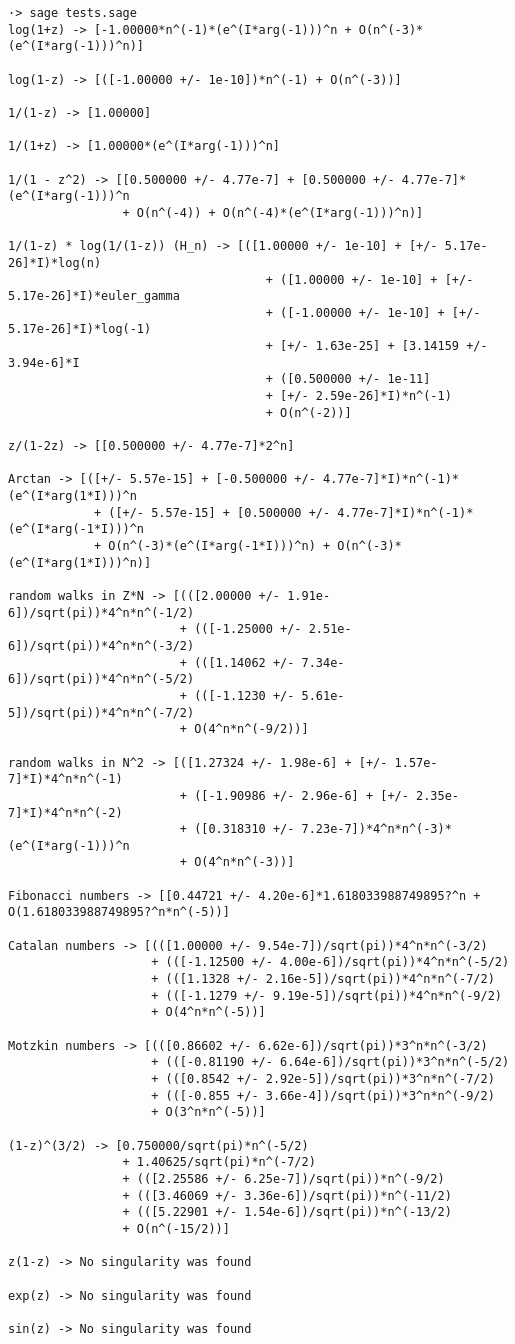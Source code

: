 \documentclass[../main.tex]{subfiles}
\begin{document}
\begin{verbatim}
·> sage tests.sage
log(1+z) -> [-1.00000*n^(-1)*(e^(I*arg(-1)))^n + O(n^(-3)*(e^(I*arg(-1)))^n)]

log(1-z) -> [([-1.00000 +/- 1e-10])*n^(-1) + O(n^(-3))]

1/(1-z) -> [1.00000]

1/(1+z) -> [1.00000*(e^(I*arg(-1)))^n]

1/(1 - z^2) -> [[0.500000 +/- 4.77e-7] + [0.500000 +/- 4.77e-7]*(e^(I*arg(-1)))^n
				+ O(n^(-4)) + O(n^(-4)*(e^(I*arg(-1)))^n)]

1/(1-z) * log(1/(1-z)) (H_n) -> [([1.00000 +/- 1e-10] + [+/- 5.17e-26]*I)*log(n)
									+ ([1.00000 +/- 1e-10] + [+/- 5.17e-26]*I)*euler_gamma
									+ ([-1.00000 +/- 1e-10] + [+/- 5.17e-26]*I)*log(-1)
									+ [+/- 1.63e-25] + [3.14159 +/- 3.94e-6]*I
									+ ([0.500000 +/- 1e-11]
									+ [+/- 2.59e-26]*I)*n^(-1)
									+ O(n^(-2))]

z/(1-2z) -> [[0.500000 +/- 4.77e-7]*2^n]

Arctan -> [([+/- 5.57e-15] + [-0.500000 +/- 4.77e-7]*I)*n^(-1)*(e^(I*arg(1*I)))^n
			+ ([+/- 5.57e-15] + [0.500000 +/- 4.77e-7]*I)*n^(-1)*(e^(I*arg(-1*I)))^n
			+ O(n^(-3)*(e^(I*arg(-1*I)))^n) + O(n^(-3)*(e^(I*arg(1*I)))^n)]

random walks in Z*N -> [(([2.00000 +/- 1.91e-6])/sqrt(pi))*4^n*n^(-1/2)
						+ (([-1.25000 +/- 2.51e-6])/sqrt(pi))*4^n*n^(-3/2)
						+ (([1.14062 +/- 7.34e-6])/sqrt(pi))*4^n*n^(-5/2)
						+ (([-1.1230 +/- 5.61e-5])/sqrt(pi))*4^n*n^(-7/2)
						+ O(4^n*n^(-9/2))]

random walks in N^2 -> [([1.27324 +/- 1.98e-6] + [+/- 1.57e-7]*I)*4^n*n^(-1)
						+ ([-1.90986 +/- 2.96e-6] + [+/- 2.35e-7]*I)*4^n*n^(-2)
						+ ([0.318310 +/- 7.23e-7])*4^n*n^(-3)*(e^(I*arg(-1)))^n
						+ O(4^n*n^(-3))]

Fibonacci numbers -> [[0.44721 +/- 4.20e-6]*1.618033988749895?^n + O(1.618033988749895?^n*n^(-5))]

Catalan numbers -> [(([1.00000 +/- 9.54e-7])/sqrt(pi))*4^n*n^(-3/2)
					+ (([-1.12500 +/- 4.00e-6])/sqrt(pi))*4^n*n^(-5/2)
					+ (([1.1328 +/- 2.16e-5])/sqrt(pi))*4^n*n^(-7/2)
					+ (([-1.1279 +/- 9.19e-5])/sqrt(pi))*4^n*n^(-9/2)
					+ O(4^n*n^(-5))]

Motzkin numbers -> [(([0.86602 +/- 6.62e-6])/sqrt(pi))*3^n*n^(-3/2)
					+ (([-0.81190 +/- 6.64e-6])/sqrt(pi))*3^n*n^(-5/2)
					+ (([0.8542 +/- 2.92e-5])/sqrt(pi))*3^n*n^(-7/2)
					+ (([-0.855 +/- 3.66e-4])/sqrt(pi))*3^n*n^(-9/2)
					+ O(3^n*n^(-5))]

(1-z)^(3/2) -> [0.750000/sqrt(pi)*n^(-5/2)
				+ 1.40625/sqrt(pi)*n^(-7/2)
				+ (([2.25586 +/- 6.25e-7])/sqrt(pi))*n^(-9/2)
				+ (([3.46069 +/- 3.36e-6])/sqrt(pi))*n^(-11/2)
				+ (([5.22901 +/- 1.54e-6])/sqrt(pi))*n^(-13/2)
				+ O(n^(-15/2))]

z(1-z) -> No singularity was found

exp(z) -> No singularity was found

sin(z) -> No singularity was found
\end{verbatim}
\end{document}
